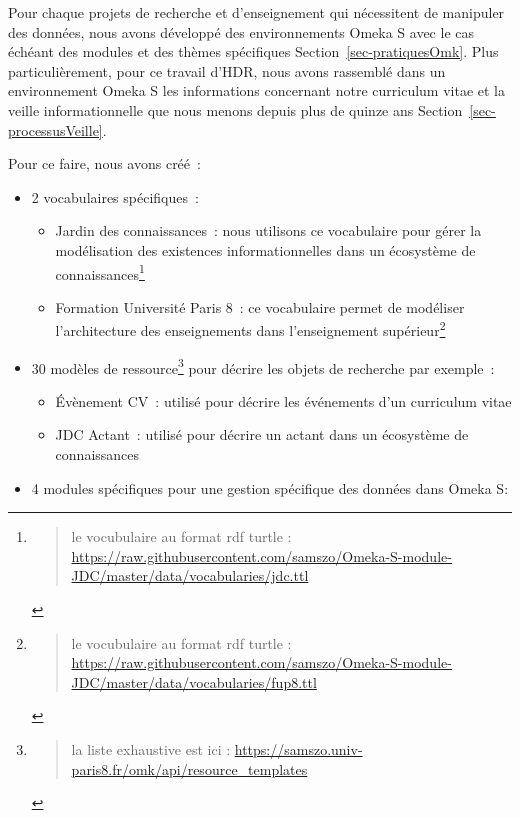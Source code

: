 \documentclass[
  letterpaper,
  DIV=11,
  numbers=noendperiod]{scrreprt}
\providecommand{\tightlist}{%
  \setlength{\itemsep}{0pt}\setlength{\parskip}{0pt}}\usepackage{longtable,booktabs,array}
\begin{document}
Pour chaque projets de recherche et d'enseignement qui nécessitent de
manipuler des données, nous avons développé des environnements Omeka S
avec le cas échéant des modules et des thèmes spécifiques
Section~\ref{sec-pratiquesOmk}. Plus particulièrement, pour ce travail
d'HDR, nous avons rassemblé dans un environnement Omeka S les
informations concernant notre curriculum vitae et la veille
informationnelle que nous menons depuis plus de quinze ans
Section~\ref{sec-processusVeille}.

Pour ce faire, nous avons créé~:

\begin{itemize}
\item
  2 vocabulaires spécifiques~:

  \begin{itemize}
  \tightlist
  \item
    Jardin des connaissances~: nous utilisons ce vocabulaire pour gérer
    la modélisation des existences informationnelles dans un écosystème
    de connaissances\footnote{\begin{quote}
      le vocubulaire au format rdf turtle :
      \url{https://raw.githubusercontent.com/samszo/Omeka-S-module-JDC/master/data/vocabularies/jdc.ttl}
      \end{quote}}
  \item
    Formation Université Paris 8~: ce vocabulaire permet de modéliser
    l'architecture des enseignements dans l'enseignement
    supérieur\footnote{\begin{quote}
      le vocubulaire au format rdf turtle :
      \url{https://raw.githubusercontent.com/samszo/Omeka-S-module-JDC/master/data/vocabularies/fup8.ttl}
      \end{quote}}
  \end{itemize}
\item
  30 modèles de ressource\footnote{\begin{quote}
    la liste exhaustive est ici :
    \url{https://samszo.univ-paris8.fr/omk/api/resource_templates}
    \end{quote}} pour décrire les objets de recherche par exemple~:

  \begin{itemize}
  \tightlist
  \item
    Évènement CV~: utilisé pour décrire les événements d'un curriculum
    vitae
  \item
    JDC Actant~: utilisé pour décrire un actant dans un écosystème de
    connaissances
  \end{itemize}
\item
  4 modules spécifiques pour une gestion spécifique des données dans
  Omeka S:


\end{itemize}
\end{document}
